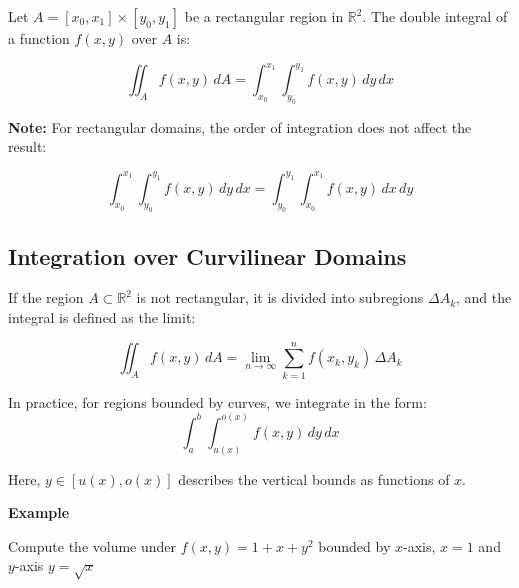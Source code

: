 Let \( A = [x_0, x_1] \times [y_0, y_1] \) be a rectangular region in \( \mathbb{R}^2 \). The double integral of a function \( f(x, y) \) over \( A \) is:

\[
\iint_A f(x, y)\, dA = \int_{x_0}^{x_1} \int_{y_0}^{y_1} f(x, y)\, dy\, dx
\]

\textbf{Note:} For rectangular domains, the order of integration does not affect the result:

\[
\int_{x_0}^{x_1} \int_{y_0}^{y_1} f(x, y)\, dy\, dx = \int_{y_0}^{y_1} \int_{x_0}^{x_1} f(x, y)\, dx\, dy
\]


\subsection{Integration over Curvilinear Domains}

If the region \( A \subset \mathbb{R}^2 \) is not rectangular, it is divided into subregions \( \Delta A_k \), and the integral is defined as the limit:

\[
\iint_A f(x, y)\, dA = \lim_{n \to \infty} \sum_{k=1}^n f(x_k, y_k) \, \Delta A_k
\]

In practice, for regions bounded by curves, we integrate in the form:
\[
\int_a^b \int_{u(x)}^{o(x)} f(x, y)\, dy\, dx
\]

Here, \( y \in [u(x), o(x)] \) describes the vertical bounds as functions of \( x \).

\textbf{Example}

Compute the volume under \(f(x,y) = 1 + x + y^2\) bounded by \(x\)-axis, \(x = 1\) and \(y\)-axis \(y = \sqrt{x}\)

\begin{center}
\end{center}


